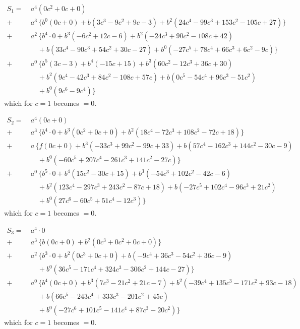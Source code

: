\documentclass[11pt]{article}
\begin{document}
\medskip

\begin{align*}
S_1 = \ {}& a^4 (0c^2 + 0c + 0) \\
{}+{}& a^3\,\{ b^0 (0c+0) + b (3c^3 - 9c^2 + 9c - 3) + b^2 (24c^4 - 99c^3 + 153c^2 - 105c + 27) \} \\
{}+{}& a^2\,\{ b^4 \cdot 0 + b^3 (-6c^2 + 12c - 6) + b^2 (-24c^3 + 90c^2 - 108c + 42) \\
       &\quad + b (33c^4 - 90c^3 + 54c^2 + 30c - 27) + b^0 (-27c^5 + 78c^4 + 66c^3 + 6c^2 - 9c) \} \\
{}+{}& a^0\,\{ b^5 (3c-3) + b^4 (-15c+15) + b^3 (60c^2 - 12c^3 + 36c + 30) \\
       &\quad + b^2 (9c^4 - 42c^3 + 84c^2 - 108c + 57c) + b (0c^5 - 54c^4 + 96c^3 - 51c^2) \\
       &\quad + b^0 (9c^6 - 9c^4) \}
\end{align*}
which for $c=1$ becomes $=0$.

\medskip

\begin{align*}
S_2 = \ {}& a^4 (0c+0) \\
{}+{}& a^3\,\{ b^4 \cdot 0 + b^3 (0c^2 + 0c + 0) + b^2 (18c^4 - 72c^3 + 108c^2 - 72c + 18) \} \\
{}+{}& a\,\{f (0c+0) + b^3 (-33c^3 + 99c^2 - 99c + 33) + b (57c^4 - 162c^3 + 144c^2 - 30c - 9) \\
       &\quad + b^0 (-60c^5 + 207c^4 - 261c^3 + 141c^2 - 27c) \} \\
{}+{}& a^0\,\{ b^5 \cdot 0 + b^4 (15c^2 - 30c + 15) + b^3 (-54c^3 + 102c^2 - 42c - 6) \\
       &\quad + b^2 (123c^4 - 297c^3 + 243c^2 - 87c + 18) + b (-27c^5 + 102c^4 - 96c^3 + 21c^2) \\
       &\quad + b^0 (27c^6 - 60c^5 + 51c^4 - 12c^3) \}
\end{align*}
which for $c=1$ becomes $=0$.

\medskip

\begin{align*}
S_3 = \ {}& a^4 \cdot 0 \\
{}+{}& a^3\,\{ b (0c+0) + b^2 (0c^3 + 0c^2 + 0c + 0) \} \\
{}+{}& a^2\,\{ b^3 \cdot 0 + b^2 (0c^3 + 0c + 0) + b (-9c^4 + 36c^3 - 54c^2 + 36c - 9) \\
       &\quad + b^0 (36c^5 - 171c^4 + 324c^3 - 306c^2 + 144c - 27) \} \\
{}+{}& a^0\,\{ b^4 (0c+0) + b^3 (7c^3 - 21c^2 + 21c - 7) + b^2 (-39c^4 + 135c^3 - 171c^2 + 93c - 18) \\
       &\quad + b (66c^5 - 243c^4 + 333c^3 - 201c^2 + 45c) \\
       &\quad + b^0 (-27c^6 + 101c^5 - 141c^4 + 87c^3 - 20c^2) \}
\end{align*}
which for $c=1$ becomes $=0$.
\end{document}
